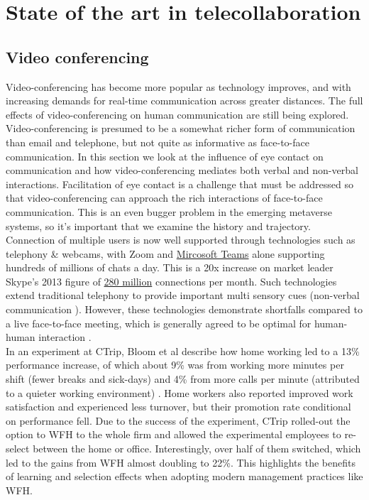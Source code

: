 
\section{State of the art in telecollaboration}
\subsection{Video conferencing}
Video-conferencing has become more popular as technology improves, and with increasing demands for real-time communication across greater distances. The full effects of video-conferencing on human communication are still being explored. Video-conferencing is presumed to be a somewhat richer form of communication than email and telephone, but not quite as informative as face-to-face communication. In this section we look at the influence of eye contact on communication and how video-conferencing mediates both verbal and non-verbal interactions. Facilitation of eye contact is a challenge that must be addressed so that video-conferencing can approach the rich interactions of face-to-face communication. This is an even bugger problem in the emerging metaverse systems, so it's important that we examine the history and trajectory.\\
Connection of multiple users is now well supported through technologies such as telephony \& webcams, with Zoom and \href{https://www.microsoft.com/en-us/Investor/earnings/FY-2021-Q1/press-release-webcast}{Mircosoft Teams} alone supporting hundreds of millions of chats a day. This is a 20x increase on market leader Skype's 2013 figure of \href{https://www.microsoft.com/en-us/Investor/earnings/FY-2013-Q1/press-release-webcast}{280 million} connections per month. Such technologies extend traditional telephony to provide important multi sensory cues (non-verbal communication \cite{Argyle1976, Wolff2008}).  However, these technologies demonstrate shortfalls compared to a live face-to-face meeting, which is generally agreed to be optimal for human-human interaction \cite{Wolff2008}.\\
In an experiment at CTrip, Bloom et al describe how home working led to a 13\% performance increase, of which about 9\% was from working more minutes per shift (fewer breaks and sick-days) and 4\% from more calls per minute (attributed to a quieter working environment) \cite{Bloom2015}. Home workers also reported improved work satisfaction and experienced less turnover, but their promotion rate conditional on performance fell. Due to the success of the experiment, CTrip rolled-out the option to WFH to the whole firm and allowed the experimental employees to re-select between the home or office. Interestingly, over half of them switched, which led to the gains from WFH almost doubling to 22\%. This highlights the benefits of learning and selection effects when adopting modern management practices like WFH.\\
